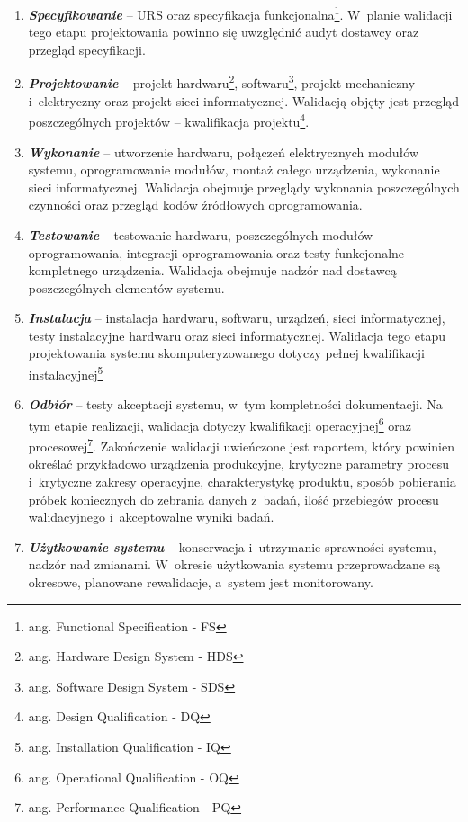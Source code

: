 \documentclass[brudnopis]{xmgr}
\begin{document}
\begin{enumerate}
  \item \textbf{\textit{Specyfikowanie}} – \textcolor{sa}{URS oraz specyfikacja funkcjonalna\footnote{ang. Functional Specification - FS}. W~planie walidacji tego etapu projektowania powinno się uwzględnić audyt dostawcy oraz przegląd specyfikacji.}
  \item \textbf{\textit{Projektowanie}} – \textcolor{sa}{projekt hardwaru\footnote{ang. Hardware Design System - HDS}, softwaru\footnote{ang. Software Design System - SDS}, projekt mechaniczny i~elektryczny oraz projekt sieci informatycznej. Walidacją objęty jest przegląd poszczególnych projektów – kwalifikacja projektu\footnote{ang. Design Qualification - DQ}.}
  \item \textbf{\textit{Wykonanie}} – \textcolor{sa}{utworzenie hardwaru, połączeń elektrycznych modułów systemu, oprogramowanie modułów, montaż całego urządzenia, wykonanie sieci informatycznej. Walidacja obejmuje przeglądy wykonania poszczególnych czynności oraz przegląd kodów źródłowych oprogramowania.}
\item \textbf{\textit{Testowanie}} – \textcolor{sa}{testowanie hardwaru, poszczególnych modułów oprogramowania,  integracji oprogramowania oraz testy funkcjonalne kompletnego urządzenia. Walidacja obejmuje nadzór nad dostawcą poszczególnych elementów systemu.}
\item \textbf{\textit{Instalacja}} – \textcolor{sa}{instalacja hardwaru, softwaru, urządzeń, sieci informatycznej, testy instalacyjne hardwaru oraz sieci informatycznej. Walidacja tego etapu projektowania systemu skomputeryzowanego dotyczy pełnej kwalifikacji instalacyjnej\footnote{ang. Installation Qualification - IQ}}
\item \textbf{\textit{Odbiór}} – \textcolor{sa}{testy akceptacji systemu, w~tym kompletności dokumentacji. Na tym etapie realizacji, walidacja dotyczy kwalifikacji operacyjnej\footnote{ang. Operational Qualification - OQ} oraz procesowej\footnote{ang. Performance Qualification - PQ}. Zakończenie walidacji uwieńczone jest raportem, który powinien określać przykładowo urządzenia produkcyjne, krytyczne parametry procesu i~krytyczne zakresy operacyjne, charakterystykę produktu, sposób pobierania próbek koniecznych do zebrania danych z~badań, ilość przebiegów procesu walidacyjnego i~akceptowalne wyniki badań.}
\item \textbf{\textit{Użytkowanie systemu}} – \textcolor{sa}{konserwacja i~utrzymanie sprawności systemu, nadzór nad zmianami. W~okresie użytkowania systemu przeprowadzane są okresowe, planowane rewalidacje, a~system jest monitorowany.\cite{LAB-EL2}}
\end{enumerate}
\end{document}
